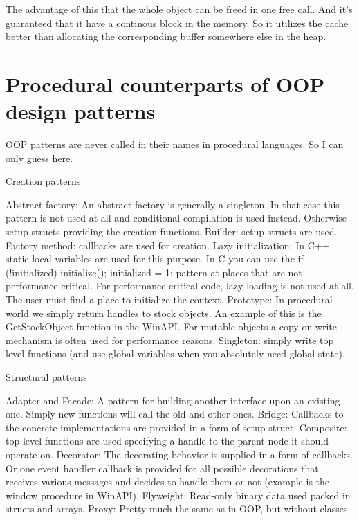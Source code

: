 \documentclass{book}
\begin{document}
The advantage of this that the whole object can be freed in one free call. And it's guaranteed that it have a continous block in the memory. 
So it utilizes the cache better than allocating the corresponding buffer somewhere else in the heap.

\chapter{Procedural counterparts of OOP design patterns}

OOP patterns are never called in their names in procedural languages. So I can only guess here.

Creation patterns

    Abstract factory: An abstract factory is generally a singleton. In that case this pattern is not used at all and conditional compilation is used instead. 
                        Otherwise setup structs providing the creation functions.
    Builder: setup structs are used.
    Factory method: callbacks are used for creation.
    Lazy initialization: In C++ static local variables are used for this purpose. 
                    In C you can use the if (!initialized) { initialize(); initialized = 1; } pattern at places that are not performance critical. 
                    For performance critical code, lazy loading is not used at all. The user must find a place to initialize the context.
    Prototype: In procedural world we simply return handles to stock objects. An example of this is the GetStockObject function in the WinAPI. 
                    For mutable objects a copy-on-write mechanism is often used for performance reasons.
    Singleton: simply write top level functions (and use global variables when you absolutely need global state).

Structural patterns

    Adapter and Facade: A pattern for building another interface upon an existing one. Simply new functions will call the old and other ones.
    Bridge: Callbacks to the concrete implementations are provided in a form of setup struct.
    Composite: top level functions are used specifying a handle to the parent node it should operate on.
    Decorator: The decorating behavior is supplied in a form of callbacks. 
                Or one event handler callback is provided for all possible decorations that receives various messages and decides to handle them or not (example is the window procedure in WinAPI).
    Flyweight: Read-only binary data used packed in structs and arrays.
    Proxy: Pretty much the same as in OOP, but without classes.
\end{document}
